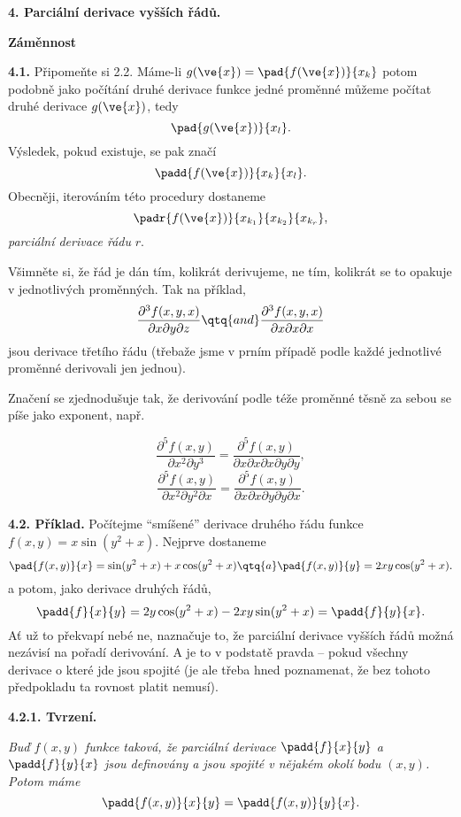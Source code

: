 \documentclass[12pt]{article}
\begin{document}
{\vskip10mm

 
  
 {\large\bf 4. Parciální derivace vyšších řádů.}
 
 \medskip
 
 \hskip7mm {\large\bf Záměnnost}
 
 \bigskip
 



{\bf 4.1.} Připomeňte si 2.2. Máme-li $g(\ve{x})=\pad{f(\ve{x})}{x_k}$ potom podobně jako počítání druhé derivace
funkce jedné proměnné můžeme počítat druhé derivace $g(\ve{x})$, tedy
$$
\pad{g(\ve{x})}{x_l}.
$$
Výsledek, pokud existuje, se pak značí
$$
\padd{f(\ve{x})}{x_k}{x_l}.
$$
Obecněji, iterováním této procedury dostaneme
$$
\padr{f(\ve{x})}{x_{k_1}}{x_{k_2}}{x_{k_r}},
$$
{\em parciální derivace řádu} $r$.

Všimněte si, že řád je dán tím, kolikrát derivujeme, ne tím, kolikrát se to opakuje v jednotlivých proměnných.
Tak na příklad,
$$
\frac{\partial^3f(x,y,x)}{\partial x\partial y\partial z}\qtq{and}
\frac{\partial^3f(x,y,x)}{\partial x\partial x\partial x}
$$
jsou derivace třetího řádu (třebaže jsme v prním případě podle každé jednotlivé proměnné derivovali jen jednou).

Značení se zjednodušuje tak, že derivování podle téže proměnné těsně za sebou
se píše jako exponent, např.

$$
\frac{\partial^5f(x,y)}{\partial x^2\partial y^3}=\frac{\partial^5f(x,y)}{
\partial x\partial x\partial x\partial y\partial y},
$$
$$\frac{\partial^5f(x,y)}{\partial x^2\partial y^2\partial x}
=\frac{\partial^5f(x,y)}{\partial x\partial x \partial y \partial y\partial x}.$$ 

\bigskip

{\bf 4.2. Příklad.} Počítejme ``smíšené'' derivace druhého řádu funkce 
$
f(x,y)= x\sin(y^2+x).
$
Nejprve dostaneme 
$$
\pad{f(x,y)}{x}=\sin(y^2+x)+x\cos(y^2+x)\qtq{a} \pad{f(x,y)}{y}=2xy\cos(y^2+x).
$$
a potom, jako derivace druhých řádů,
$$
\padd{f}{x}{y}=2y\cos(y^2+x)-2xy\sin(y^2+x)=\padd{f}{y}{x}.
$$
Ať už to překvapí nebé ne, naznačuje to, že parciální derivace vyšších řádů možná nezávisí na pořadí derivování.  A je to v podstatě pravda -- pokud všechny derivace o které jde jsou spojité
(je ale třeba hned poznamenat, že bez tohoto předpokladu
ta rovnost platit nemusí).

\medskip

{\bf 4.2.1. Tvrzení.} {\em Buď $f(x,y)$ funkce taková, že
parciální derivace $\padd{f}{x}{y}$ a $\padd{f}{y}{x}$ jsou definovány a jsou spojité
v nějakém okolí bodu $(x,y)$. Potom máme
$$
\padd{f(x,y)}{x}{y}=\padd{f(x,y)}{y}{x}.
$$

}}
\end{document}
